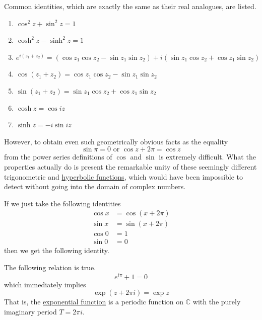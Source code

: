     \begin{lemma}
      \label{thm:trigonometric-hyperbolic-identities-over-c}
      Common identities, which are exactly the same as their real analogues, are listed. 
      \begin{enumerate}
        \item $\cos^2{z} + \sin^2 {z} = 1$
        \item $\cosh^2{z} - \sinh^2{z} = 1$ 
        \item $e^{i(z_1 + z_2)} = (\cos{z_1} \cos{z_2} - \sin{z_1} \sin{z_2}) + i (\sin{z_1} \cos{z_2} + \cos{z_1} \sin{z_2})$
        \item $\cos{(z_1 + z_2)} = \cos{z_1} \cos{z_2} - \sin{z_1} \sin{z_2}$
        \item $\sin{(z_1 + z_2)} = \sin{z_1} \cos{z_2} + \cos{z_1} \sin{z_2}$
        \item $\cosh{z} = \cos{iz}$ 
        \item $\sinh{z} = -i \sin{iz}$
      \end{enumerate}
    \end{lemma}

    However, to obtain even such geometrically obvious facts as the equality
    \begin{equation}
      \sin{\pi} = 0 \text{ or } \cos{z + 2\pi} = \cos{z}
    \end{equation}
    from the power series definitions of $\cos$ and $\sin$ is extremely difficult. What the properties actually do is present the remarkable unity of these seemingly different trigonometric and \hyperref[def:hyperbolic-functions]{hyperbolic functions}, which would have been impossible to detect without going into the domain of complex numbers. 

    If we just take the following identities
    \begin{align*}
        \cos{x} & = \cos{(x + 2 \pi)} \\
        \sin{x} & = \sin{(x + 2\pi)} \\
        \cos{0} & = 1 \\
        \sin{0} & = 0
    \end{align*}
    then we get the following identity. 

    \begin{theorem}
      \label{thm:eulers-identity}
    The following relation is true. 
    \begin{equation}
      e^{i\pi} + 1 = 0
    \end{equation}
    which immediately implies 
    \begin{equation}
      \exp(z + 2\pi i) = \exp{z}
    \end{equation}
    That is, the \hyperref[real-def:exponential-function]{exponential function} is a periodic function on $\mathbb{C}$ with the purely imaginary period $T = 2 \pi i$. 
    \end{theorem}

